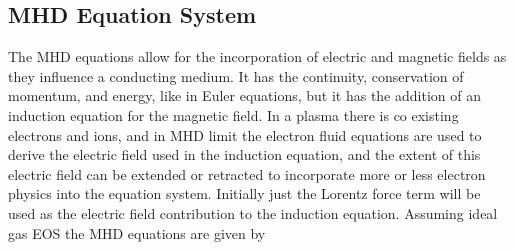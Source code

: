 \documentclass[paper=a4, fontsize=11pt]{scrartcl}
\numberwithin{equation}{section}                %
\numberwithin{figure}{section}                  %
\numberwithin{table}{section}                           %
\begin{document}
\subsection{MHD Equation System}

The MHD equations allow for the incorporation of electric and magnetic fields as they influence a conducting medium. It has the continuity, conservation of momentum, and energy, like in Euler equations, but it has the addition of an induction equation for the magnetic field. In a plasma there is co existing electrons and ions, and in MHD limit the electron fluid equations are used to derive the electric field used in the induction equation, and the extent of this electric field can be extended or retracted to incorporate more or less electron physics into the equation system. Initially just the Lorentz force term will be used as the electric field contribution to the induction equation. Assuming ideal gas EOS the MHD equations are given by
\end{document}
